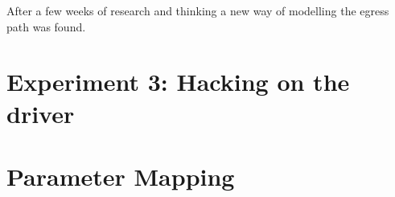 
After a few weeks of research and thinking a new way of modelling the egress
path was found.





%










\section{Experiment 3: Hacking on the driver}


\section{Parameter Mapping}

